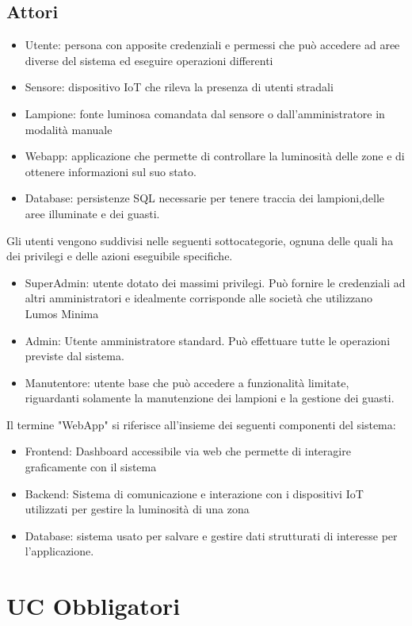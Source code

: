 \documentclass[12pt]{article}
\begin{document}
\subsection{Attori}
\begin{itemize}
	\item Utente: persona con apposite credenziali e permessi che può accedere ad aree diverse del sistema ed eseguire operazioni differenti
	\item Sensore: dispositivo IoT che rileva la presenza di utenti stradali
	\item Lampione: fonte luminosa comandata dal sensore o dall'amministratore in modalità manuale
	\item Webapp: applicazione che permette di controllare la luminosità delle zone e di ottenere informazioni sul suo stato.
	\item Database: persistenze SQL necessarie per tenere traccia dei lampioni,delle aree illuminate e dei guasti.
\end{itemize}
Gli utenti vengono suddivisi nelle seguenti sottocategorie, ognuna delle quali ha dei privilegi e delle azioni eseguibile specifiche.
\begin{itemize}
	\item SuperAdmin: utente dotato dei massimi privilegi. Può fornire le credenziali ad altri amministratori e idealmente corrisponde alle società che utilizzano Lumos Minima
	\item Admin: Utente amministratore standard. Può effettuare tutte le operazioni previste dal sistema.
	\item Manutentore: utente base che può accedere a funzionalità limitate, riguardanti solamente la manutenzione dei lampioni e la gestione dei guasti.
\end{itemize} 
Il termine "WebApp" si riferisce all'insieme dei seguenti componenti del sistema:
\begin{itemize}
	\item Frontend: Dashboard accessibile via web che permette di interagire graficamente con il sistema
	\item Backend: Sistema di comunicazione e interazione con i dispositivi IoT utilizzati per gestire la luminosità di una zona
	\item Database: sistema usato per salvare e gestire dati strutturati di interesse per l'applicazione.
\end{itemize}


\pagebreak
\section{UC Obbligatori}
\end{document}
